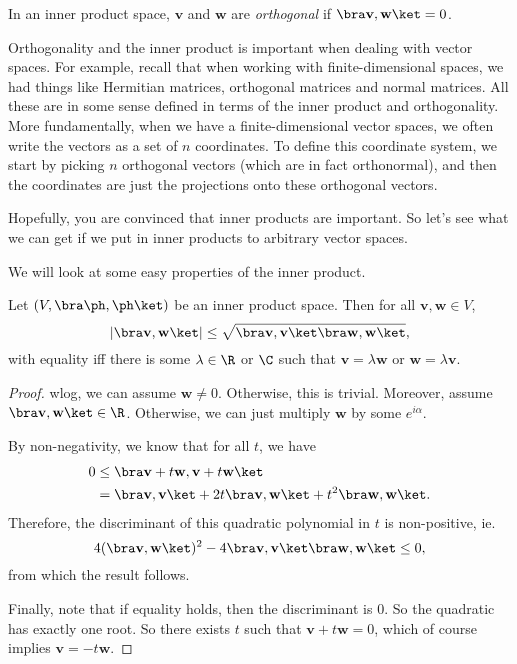 \documentclass[a4paper]{article}
\begin{document}
\begin{defi}[Orthogonality]
  In an inner product space, $\mathbf{v}$ and $\mathbf{w}$ are \emph{orthogonal} if $\bra \mathbf{v}, \mathbf{w} \ket = 0$.
\end{defi}

Orthogonality and the inner product is important when dealing with vector spaces. For example, recall that when working with finite-dimensional spaces, we had things like Hermitian matrices, orthogonal matrices and normal matrices. All these are in some sense defined in terms of the inner product and orthogonality. More fundamentally, when we have a finite-dimensional vector spaces, we often write the vectors as a set of $n$ coordinates. To define this coordinate system, we start by picking $n$ orthogonal vectors (which are in fact orthonormal), and then the coordinates are just the projections onto these orthogonal vectors.

Hopefully, you are convinced that inner products are important. So let's see what we can get if we put in inner products to arbitrary vector spaces.

We will look at some easy properties of the inner product.
\begin{prop}
  Let $(V, \bra \ph,\ph\ket)$ be an inner product space. Then for all $\mathbf{v}, \mathbf{w} \in V$,
  \[
    |\bra \mathbf{v}, \mathbf{w}\ket| \leq \sqrt{\bra \mathbf{v}, \mathbf{v}\ket \bra \mathbf{w}, \mathbf{w}\ket},
  \]
  with equality iff there is some $\lambda \in \R$ or $\C$ such that $\mathbf{v} = \lambda \mathbf{w}$ or $\mathbf{w} = \lambda \mathbf{v}$.
\end{prop}

\begin{proof}
  wlog, we can assume $\mathbf{w} \not= 0$. Otherwise, this is trivial. Moreover, assume $\bra \mathbf{v}, \mathbf{w}\ket \in \R$. Otherwise, we can just multiply $\mathbf{w}$ by some $e^{i\alpha}$.

  By non-negativity, we know that for all $t$, we have
  \begin{align*}
    0 &\leq \bra \mathbf{v} + t\mathbf{w}, \mathbf{v} + t\mathbf{w}\ket\\
    &= \bra \mathbf{v}, \mathbf{v}\ket + 2t\bra \mathbf{v}, \mathbf{w}\ket + t^2 \bra \mathbf{w}, \mathbf{w}\ket.
  \end{align*}
  Therefore, the discriminant of this quadratic polynomial in $t$ is non-positive, ie.
  \[
    4(\bra \mathbf{v}, \mathbf{w}\ket)^2 - 4\bra \mathbf{v}, \mathbf{v}\ket \bra \mathbf{w}, \mathbf{w}\ket \leq 0,
  \]
  from which the result follows.

  Finally, note that if equality holds, then the discriminant is $0$. So the quadratic has exactly one root. So there exists $t$ such that $\mathbf{v} + t\mathbf{w} = 0$, which of course implies $\mathbf{v} = -t\mathbf{w}$.
\end{proof}
\end{document}
